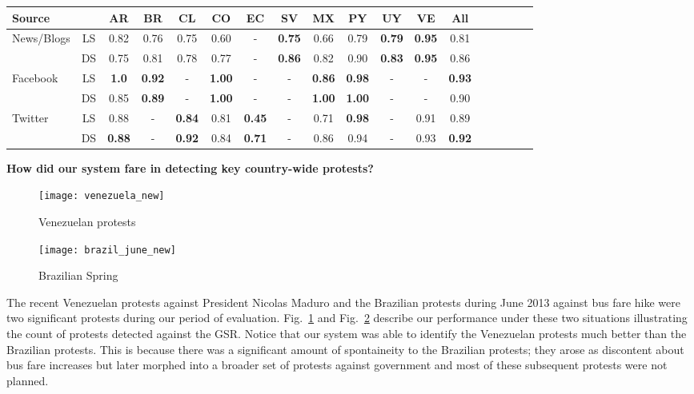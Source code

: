 \begin{table*} %
\centering
\caption{Comparing the location and date scores of different sources in specific countries.
AR=Argentina; BR=Brazil; CL=Chile; CO=Colombia; EC=Ecuador;SV=El Salvador; MX=Mexico; PY=Paraguay; UY=Uruguay; VE=Venezuela. A $-$ indicates that the source did not produce any warnings for that country in the studied period.}
\label{tb:modelwisecomparison}
\begin{tabular}{|l|*{17}{c|}}
\toprule
Source& & AR & BR & CL & CO & EC & SV & MX & PY & UY & VE & All\\
\toprule
\multirow{2}{*}{News/Blogs} &LS &0.82&0.76&0.75&0.60&-&{\bf0.75}&0.66&0.79&{\bf0.79}&{\bf0.95}&0.81\\
                            &DS&0.75&0.81&0.78&0.77&-&{\bf0.86}&0.82&0.90&{\bf0.83}&{\bf0.95}&0.86\\
\midrule
\multirow{2}{*}{Facebook} &LS &{\bf1.0}&{\bf0.92}&-&{\bf1.00}&-&-&{\bf0.86}&{\bf0.98}&-&-&{\bf0.93}\\
                          &DS&0.85&{\bf0.89}&-&{\bf1.00}&-&-&{\bf1.00}&{\bf1.00}&-&-&0.90\\
\midrule
\multirow{2}{*}{Twitter} &LS &0.88&-&{\bf0.84}&0.81&{\bf0.45}&-&0.71&{\bf0.98}&-&0.91&0.89\\
                         &DS&{\bf0.88}&-&{\bf0.92}&0.84&{\bf0.71}&-&0.86&0.94&-&0.93&{\bf0.92}\\
\bottomrule
\end{tabular}
\end{table*}

\noindent
{\bf How did our system fare in detecting key country-wide protests?}
\begin{figure*}
  \begin{subfigure}{\columnwidth}
    \centering
    \texttt{[image: venezuela\_new]}
    \caption{Venezuelan protests}
    \label{fig:venezuela_feb}
\end{subfigure}
\begin{subfigure}{\columnwidth}
    \centering
    \texttt{[image: brazil\_june\_new]}
    \caption{Brazilian Spring}
    \label{fig:brazil_june}
\end{subfigure}
\caption{Mass protests forecasted by our system}
\end{figure*}

The recent Venezuelan protests against President Nicolas Maduro and the Brazilian protests during June 2013 against bus fare hike were two significant protests during our period of evaluation. Fig.~\ref{fig:venezuela_feb} and
Fig.~\ref{fig:brazil_june} describe our performance under these two situations illustrating the count
of protests detected against the GSR. Notice that our system was able to 
identify the Venezuelan protests much better than the Brazilian protests. This is because there was a significant amount
of spontaineity to the Brazilian protests; they arose as discontent about bus fare increases but later morphed into a broader
set of protests against government and most of these subsequent protests were not planned.\\

